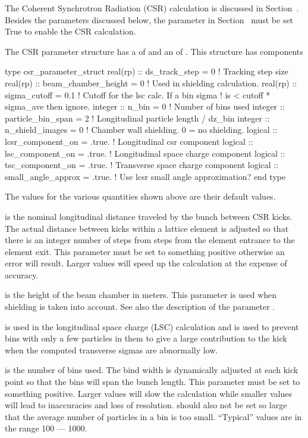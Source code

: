 The Coherent Synchrotron Radiation (CSR) calculation is discussed in
Section~. Besides the parameters discussed below, the
 parameter in Section~
must be set True to enable the CSR calculation.

The CSR parameter structure has a 
of  and an  of .
This structure has components
\begin{example}
  type csr_parameter_struct 
    real(rp) :: ds_track_step = 0          ! Tracking step size
    real(rp) :: beam_chamber_height = 0    ! Used in shielding calculation.
    real(rp) :: sigma_cutoff = 0.1         ! Cutoff for the lsc calc. If a bin sigma
                                           !  is < cutoff * sigma_ave then ignore.
    integer :: n_bin = 0                   ! Number of bins used
    integer :: particle_bin_span = 2       ! Longitudinal particle length / dz_bin
    integer :: n_shield_images = 0         ! Chamber wall shielding. 0 = no shielding.
    logical :: lcsr_component_on = .true.  ! Longitudinal csr component
    logical :: lsc_component_on = .true.   ! Longitudinal space charge component
    logical :: tsc_component_on = .true.   ! Transverse space charge component
    logical :: small_angle_approx = .true. ! Use lcsr small angle approximation?
  end type
\end{example}
The values for the various quantities shown above are their default values. 

 is the nominal longitudinal distance traveled by
the bunch between CSR kicks. The actual distance between kicks within
a lattice element is adjusted so that there is an integer number of
steps from steps from the element entrance to the element exit.  This
parameter must be set to something positive otherwise an error will
result. Larger values will speed up the calculation at the expense of
accuracy.

 is the height of the beam chamber in
meters. This parameter is used when shielding is taken into account.
See also the description of the parameter .

 is used in the longitudinal space charge (LSC)
calculation and is used to prevent bins with only a few particles in
them to give a large contribution to the kick when the computed
transverse sigmas are abnormally low.

 is the number of bins used. The bind width is dynamically
adjusted at each kick point so that the bins will span the bunch
length.  This parameter must be set to something positive. Larger
values will slow the calculation while smaller values will lead to
inaccuracies and loss of resolution.  should also not be set
so large that the average number of particles in a bin is too small. 
``Typical'' values are in the range 100 --- 1000.

